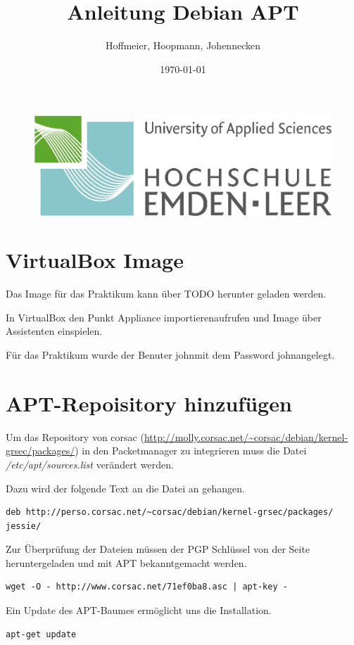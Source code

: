 \documentclass[parskip=full-]{scrartcl}
\author{Hoffmeier, Hoopmann, Johennecken}
\title{Anleitung Debian APT}
\date {\today}
\begin{document}
\maketitle
\begin{figure}[H]
    \centering
    \includegraphics[scale=.5]{img/hs}
\end{figure}
\begin{abstract}
\end{abstract}
\section{VirtualBox Image}
Das Image für das Praktikum kann über TODO herunter geladen werden.

In VirtualBox den Punkt \glqq Appliance importieren\grqq aufrufen und Image über Assistenten einspielen.

Für das Praktikum wurde der Benuter \glqq john\grqq mit dem Password \glqq john\grqq angelegt.
\section{APT-Repoisitory hinzufügen}
Um das Repository von corsac (\url{http://molly.corsac.net/~corsac/debian/kernel-grsec/packages/}) in den Packetmanager zu integrieren muss die Datei \textit{/etc/apt/sources.list} verändert werden.

Dazu wird der folgende Text an die Datei an gehangen. 
\begin{lstlisting}
deb http://perso.corsac.net/~corsac/debian/kernel-grsec/packages/ jessie/
\end{lstlisting}

Zur Überprüfung der Dateien müssen der PGP Schlüssel von der Seite heruntergeladen und mit APT bekanntgemacht werden.
\begin{lstlisting}
wget -O - http://www.corsac.net/71ef0ba8.asc | apt-key -
\end{lstlisting}

Ein Update des APT-Baumes ermöglicht uns die Installation.
\begin{lstlisting}
apt-get update
\end{lstlisting}
\end{document}
